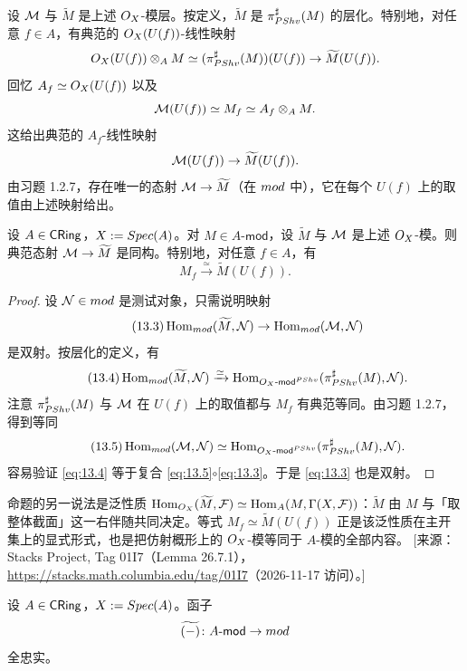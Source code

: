 设 $\mathcal{M}$ 与 $\widetilde{M}$ 是上述 $O_X$-模层。按定义，$\widetilde{M}$ 是 $\pi^{\sharp}_{PShv}(M)$ 的层化。特别地，对任意 $f\in A$，有典范的 $O_X(U(f))$-线性映射
\[
O_X(U(f))\otimes_AM\simeq(\pi^{\sharp}_{PShv}(M))(U(f))\to\widetilde{M}(U(f)).
\]
回忆 $A_f\simeq O_X(U(f))$ 以及
\[
\mathcal{M}(U(f))\simeq M_f\simeq A_f\otimes_AM.
\]
这给出典范的 $A_f$-线性映射
\[
\mathcal{M}(U(f))\to\widetilde{M}(U(f)).
\]
由习题 1.2.7，存在唯一的态射 $\mathcal{M}\to\widetilde{M}$（在 $mod$ 中），它在每个 $U(f)$ 上的取值由上述映射给出。

\begin{proposition}\label{prop:13.1.5}
设 $A\in\mathsf{CRing}$，$X:=Spec(A)$。对 $M\in A\text{-}\mathsf{mod}$，设 $\widetilde{M}$ 与 $\mathcal{M}$ 是上述 $O_X$-模。则典范态射 $\mathcal{M}\to\widetilde{M}$ 是同构。特别地，对任意 $f\in A$，有
\[
M_f\xrightarrow{\simeq}\widetilde{M}(U(f)).
\]
\end{proposition}

\begin{proof}
设 $\mathcal{N}\in mod$ 是测试对象，只需说明映射
\begin{equation}\tag{13.3}\label{eq:13.3}
\operatorname{Hom}_{mod}(\widetilde{M},\mathcal{N})\to\operatorname{Hom}_{mod}(\mathcal{M},\mathcal{N})
\end{equation}
是双射。按层化的定义，有
\begin{equation}\tag{13.4}\label{eq:13.4}
\operatorname{Hom}_{mod}(\widetilde{M},\mathcal{N})\xrightarrow{\simeq}\operatorname{Hom}_{O_X\text{-}\mathsf{mod}^{PShv}}(\pi^{\sharp}_{PShv}(M),\mathcal{N}).
\end{equation}
注意 $\pi^{\sharp}_{PShv}(M)$ 与 $\mathcal{M}$ 在 $U(f)$ 上的取值都与 $M_f$ 有典范等同。由习题 1.2.7，得到等同
\begin{equation}\tag{13.5}\label{eq:13.5}
\operatorname{Hom}_{mod}(\mathcal{M},\mathcal{N})\simeq\operatorname{Hom}_{O_X\text{-}\mathsf{mod}^{PShv}}(\pi^{\sharp}_{PShv}(M),\mathcal{N}).
\end{equation}
容易验证 \eqref{eq:13.4} 等于复合 \eqref{eq:13.5}$\circ$\eqref{eq:13.3}。于是 \eqref{eq:13.3} 也是双射。
\end{proof}

\begin{yizhu}
命题的另一说法是泛性质 $\operatorname{Hom}_{O_X}(\widetilde{M},\mathcal{F})\simeq\operatorname{Hom}_A(M,\Gamma(X,\mathcal{F}))$：$\widetilde{M}$ 由 $M$ 与「取整体截面」这一右伴随共同决定。等式 $M_f\simeq\widetilde{M}(U(f))$ 正是该泛性质在主开集上的显式形式，也是把仿射概形上的 $O_X$-模等同于 $A$-模的全部内容。
[来源：Stacks Project, Tag 01I7（Lemma 26.7.1），\url{https://stacks.math.columbia.edu/tag/01I7}（2026-11-17 访问）。]
\end{yizhu}

\begin{corollary}\label{cor:13.1.6}
设 $A\in\mathsf{CRing}$，$X:=Spec(A)$。函子
\[
\widetilde{(-)}\colon A\text{-}\mathsf{mod}\to mod
\]
全忠实。
\end{corollary}

